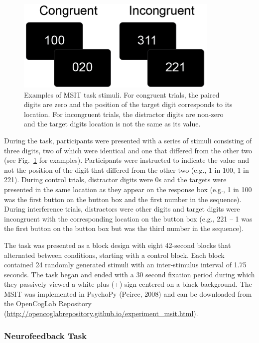\begin{figure}[h!]
   \centering
   \includegraphics[]{msit_stim.png}
   \caption{Examples of MSIT task stimuli. For congruent trials, the paired digits are zero and the position of the target digit corresponds to its location. For incongruent trials, the distractor digits are non-zero and the target digits location is not the same as its value.}
   \label{fig:msit}
\end{figure}

During the task, participants were presented with a series of stimuli consisting of three digits, two of which were identical and one that differed from the other two (see Fig.~\ref{fig:msit} for examples). Participants were instructed to indicate the value and not the position of the digit that differed from the other two (e.g., 1 in 100, 1 in 221). During control trials, distractor digits were 0s and the targets were presented in the same location as they appear on the response box (e.g., 1 in 100 was the first button on the button box and the first number in the sequence). During interference trials, distractors were other digits and target digits were incongruent with the corresponding location on the button box (e.g., 221 – 1 was the first button on the button box but was the third number in the sequence).

The task was presented as a block design with eight 42-second blocks that alternated between conditions, starting with a control block. Each block contained 24 randomly generated stimuli with an inter-stimulus interval of 1.75 seconds. The task began and ended with a 30 second fixation period during which they passively viewed a white plus (+) sign centered on a black background. The MSIT was implemented in PsychoPy (Peirce, 2008) and can be downloaded from the OpenCogLab Repository (\url{http://opencoglabrepository.github.io/experiment\_msit.html}).

\subsubsection{Neurofeedback Task}

